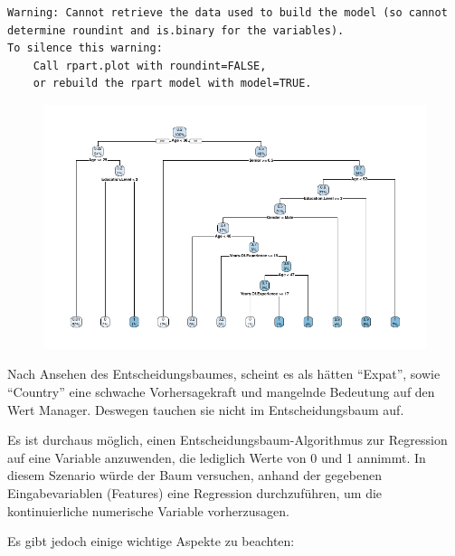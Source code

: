 \documentclass[
  letterpaper,
  DIV=11,
  numbers=noendperiod]{scrartcl}
\begin{document}
\begin{verbatim}
Warning: Cannot retrieve the data used to build the model (so cannot determine roundint and is.binary for the variables).
To silence this warning:
    Call rpart.plot with roundint=FALSE,
    or rebuild the rpart model with model=TRUE.
\end{verbatim}

\begin{figure}[H]

{\centering \includegraphics{main_doc_files/figure-pdf/unnamed-chunk-170-1.pdf}

}

\end{figure}

Nach Ansehen des Entscheidungsbaumes, scheint es als hätten ``Expat'',
sowie ``Country'' eine schwache Vorhersagekraft und mangelnde Bedeutung
auf den Wert Manager. Deswegen tauchen sie nicht im Entscheidungsbaum
auf.

Es ist durchaus möglich, einen Entscheidungsbaum-Algorithmus zur
Regression auf eine Variable anzuwenden, die lediglich Werte von 0 und 1
annimmt. In diesem Szenario würde der Baum versuchen, anhand der
gegebenen Eingabevariablen (Features) eine Regression durchzuführen, um
die kontinuierliche numerische Variable vorherzusagen.

Es gibt jedoch einige wichtige Aspekte zu beachten:
\end{document}
